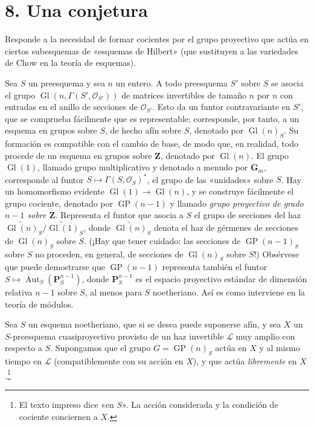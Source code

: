 \documentclass[11pt,twoside,openany]{book}
\numberwithin{equation}{section}
\newcommand{\src}[1]{%
  \phantomsection\hypertarget{src:#1}{}%
  \marginpar{\raggedleft\footnotesize\sffamily #1}%
}
\theoremstyle{plain}
\theoremstyle{definition}
\theoremstyle{remark}
\newcommand{\fsection}[2]{%
  \section*{#1. #2}%
  \addcontentsline{toc}{section}{#1. #2}%
}
\newcommand{\FgaUnitKey}{frontmatter}
\renewcommand{\src}[1]{%
  \phantomsection\hypertarget{src:\FgaUnitKey:#1}{}%
  \marginpar{\raggedleft\footnotesize\sffamily #1}%
}
\theoremstyle{plain}
\theoremstyle{definition}
\theoremstyle{remark}
\begin{document}
\fsection{8}{Una conjetura}

Responde a la necesidad de formar cocientes por el grupo proyectivo que actúa
en ciertos subesquemas de «esquemas de Hilbert» (que sustituyen a las
variedades de Chow en la teoría de esquemas).

Sea $S$ un preesquema y sea $n$ un entero. A todo preesquema $S'$ sobre $S$
se asocia el grupo $\operatorname{Gl}(n,\Gamma(S',\mathcal O_{S'}))$ de
matrices invertibles de tamaño $n$ por $n$ con entradas en el anillo de
secciones de $\mathcal O_{S'}$. Esto da un funtor contravariante en $S'$, que
se comprueba fácilmente que es representable; corresponde, por tanto, a un
esquema en grupos sobre $S$, de hecho afín sobre $S$, denotado por
$\operatorname{Gl}(n)_S$. Su formación es compatible con el cambio de base,
de modo que, en realidad, todo procede de un esquema en grupos sobre
$\mathbf Z$, denotado por $\operatorname{Gl}(n)$. El grupo
$\operatorname{Gl}(1)$, llamado grupo multiplicativo y denotado a menudo por
$\mathbf G_m$, corresponde al funtor
$S\longmapsto\Gamma(S,\mathcal O_S)^*$, el grupo de las «unidades» sobre $S$.
Hay un homomorfismo evidente
$\operatorname{Gl}(1)\to\operatorname{Gl}(n)$, y se construye fácilmente el
grupo cociente, denotado por $\operatorname{GP}(n-1)$ y llamado \emph{grupo
proyectivo de grado $n-1$ sobre $\mathbf Z$}. Representa el funtor que asocia
a $S$ el grupo de secciones del haz
$\widetilde{\operatorname{Gl}(n)}_S/
\widetilde{\operatorname{Gl}(1)}_S$, donde
$\widetilde{\operatorname{Gl}(n)}_S$ denota el haz de gérmenes de secciones de
$\operatorname{Gl}(n)_S$ sobre $S$. (¡Hay que tener cuidado: las secciones de
$\operatorname{GP}(n-1)_S$ sobre $S$ no proceden, en general, de secciones de
$\operatorname{Gl}(n)_S$ sobre $S$!) Obsérvese que puede demostrarse que
$\operatorname{GP}(n-1)$ representa también el funtor
$S\longmapsto\operatorname{Aut}_S(\mathbf P_S^{n-1})$, donde
$\mathbf P_S^{n-1}$ es el espacio proyectivo estándar de dimensión relativa
$n-1$ sobre $S$, al menos para $S$ noetheriano. Así es como interviene en la
teoría de módulos.

Sea $S$ un esquema noetheriano, que si se desea puede suponerse afín, y sea
$X$ un $S$-preesquema cuasiproyectivo provisto de un haz invertible
$\mathcal L$ muy amplio con respecto a $S$. Supongamos que el grupo
$G=\operatorname{GP}(n)_S$ actúa en $X$ y al mismo tiempo en $\mathcal L$
(compatiblemente con su acción en $X$), y que actúa \emph{libremente} en
$X$.\footnote{El texto impreso dice «en $S$». La acción considerada y la
condición de cociente conciernen a $X$.}
\src{117}
\end{document}
